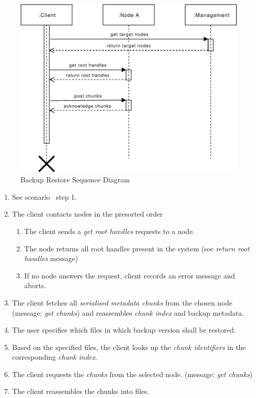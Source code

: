 \begin{figure}[h]
    \centering
    \includegraphics[width=\linewidth]{resources/backup_restore.pdf}
    \caption{Backup Restore Sequence Diagram}
    \label{fig:backup-restore}
\end{figure}

\begin{enumerate}
    \item See scenario~ step 1.
    \item The client contacts nodes in the presorted order
        \begin{enumerate}
            \item The client sends a \emph{get root handles} requests to a node.
            \item The node returns all root handles present in the system (see \emph{return root handles} message)
            \item If no node answers the request, client records an error message and aborts.
        \end{enumerate}
    \item The client fetches all \emph{serialised metadata chunks} from the chosen node (message: \emph{get chunks}) and reassembles \emph{chunk index} and backup metadata.
    \item The user specifies which files in which backup version shall be restored. %
    \item Based on the specified files, the client looks up the \emph{chunk identifiers} in the corresponding \emph{chunk index}.
    \item The client requests the \emph{chunks} from the selected node. (message: \emph{get chunks})
    \item The client reassembles the chunks into files.
\end{enumerate}


